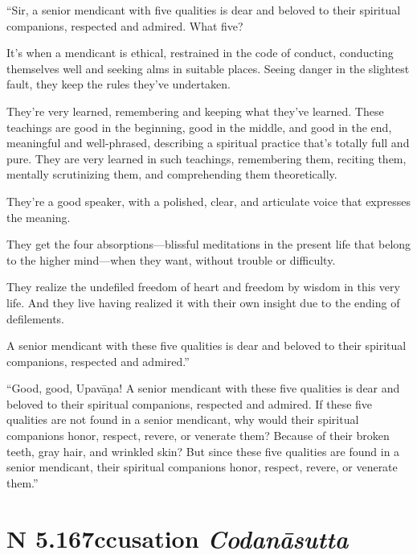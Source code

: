 \documentclass[12pt,openany]{book}%
\newcommand*{\suttatitleacronym}[1]{\smaller[2]{#1}\vspace*{.3em}}
\newcommand*{\suttatitletranslation}[1]{\linebreak{#1}}
\newcommand*{\suttatitleroot}[1]{\linebreak\smaller[2]\itshape{#1}}
\newcommand*{\tocacronym}[1]{\hspace*{-3.3em}{#1}\quad}
\newcommand*{\toctranslation}[1]{#1}
\newcommand*{\tocroot}[1]{(\textit{#1})}
\begin{document}
“Sir, a senior mendicant with five qualities is dear and beloved to their spiritual companions, respected and admired. What five? 

It’s when a mendicant is ethical, restrained in the code of conduct, conducting themselves well and seeking alms in suitable places. Seeing danger in the slightest fault, they keep the rules they’ve undertaken. 

They’re very learned, remembering and keeping what they’ve learned. These teachings are good in the beginning, good in the middle, and good in the end, meaningful and well-phrased, describing a spiritual practice that’s totally full and pure. They are very learned in such teachings, remembering them, reciting them, mentally scrutinizing them, and comprehending them theoretically. 

They’re a good speaker, with a polished, clear, and articulate voice that expresses the meaning. 

They get the four absorptions—blissful meditations in the present life that belong to the higher mind—when they want, without trouble or difficulty. 

They realize the undefiled freedom of heart and freedom by wisdom in this very life. And they live having realized it with their own insight due to the ending of defilements. 

A senior mendicant with these five qualities is dear and beloved to their spiritual companions, respected and admired.” 

“Good, good, \textsanskrit{Upavāṇa}! A senior mendicant with these five qualities is dear and beloved to their spiritual companions, respected and admired. If these five qualities are not found in a senior mendicant, why would their spiritual companions honor, respect, revere, or venerate them? Because of their broken teeth, gray hair, and wrinkled skin? But since these five qualities are found in a senior mendicant, their spiritual companions honor, respect, revere, or venerate them.” 

%
\section*{{\suttatitleacronym AN 5.167}{\suttatitletranslation Accusation }{\suttatitleroot Codanāsutta}}
\addcontentsline{toc}{section}{\tocacronym{AN 5.167} \toctranslation{Accusation } \tocroot{Codanāsutta}}
\end{document}
